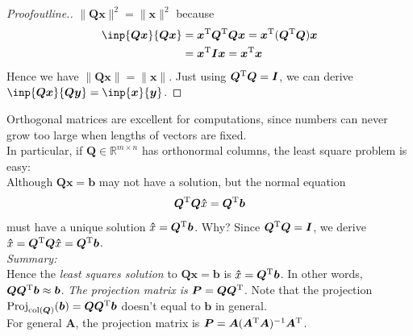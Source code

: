 \begin{proof}[Proofoutline.]
$\|\bm{Qx}\|^2=\|\bm x\|^2$ because
\[\begin{aligned}
\inp{\bm{Qx}}{\bm{Qx}}&=\bm x\trans\bm Q\trans\bm Q\bm x=\bm x\trans(\bm Q\trans\bm Q)\bm x\\
&=\bm x\trans\bm I\bm x=\bm x\trans\bm x
\end{aligned}
\]
Hence we have $\|\bm{Qx}\|=\|\bm x\|$. Just using $\bm Q^{\mathrm T}\bm Q=\bm I$, we can derive $\inp{\bm{Qx}}{\bm{Qy}}=\inp{\bm x}{\bm y}$.
\end{proof}
Orthogonal matrices are excellent for computations, since numbers can never grow too large when lengths of vectors are fixed.\\
In particular, if $\bm Q\in\mathbb{R}^{m\times n}$ has orthonormal columns, the least square problem is easy:\\
Although $\bm{Qx}=\bm b$ may not have a solution, but the normal equation
\[
\bm Q^{\mathrm T}\bm Q\bm \hat x=\bm Q^{\mathrm T}\bm b
\]
must have a unique solution $\bm\hat x=\bm Q^{\mathrm T}\bm b$. Why? Since $\bm Q^{\mathrm T}\bm Q=\bm I$, we derive $\bm\hat x=\bm Q^{\mathrm T}\bm Q\bm \hat x=\bm Q^{\mathrm T}\bm b$.\\
\emph{\textit{\Large Summary:}}\\
Hence the \emph{least squares solution} to $\bm{Qx}=\bm b$ is $\bm\hat x=\bm Q^{\mathrm T}\bm b$. In other words, $\bm Q\bm Q^{\mathrm T}\bm b\approx \bm b$. \emph{The projection matrix is} $\bm P=\bm Q\bm Q^{\mathrm T}$. Note that the projection $\operatorname{Proj}_{\operatorname{col}(\bm Q)}(\bm b)=\bm Q\bm Q^{\mathrm T}\bm b$ doesn't equal to $\bm b$ in general.\\
For general $\bm A$, the projection matrix is $\bm P=\bm A(\bm A^{\mathrm T}\bm A)^{-1}\bm A^{\mathrm T}$.
